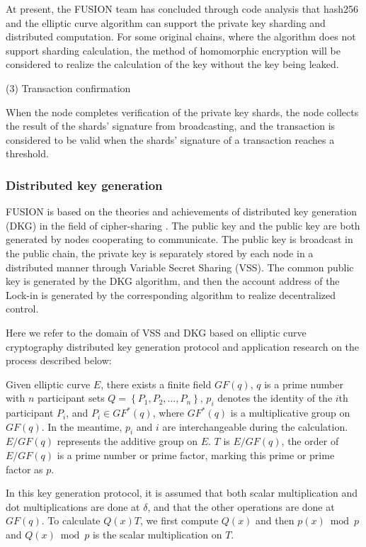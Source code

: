 \documentclass[a4paper,12pt]{article}
\begin{document}
At present, the FUSION team has concluded through code analysis that hash256 and the elliptic curve algorithm can support the private key sharding and distributed computation. For some original chains, where the algorithm does not support sharding calculation, the method of homomorphic encryption will be considered to realize the calculation of the key without the key being leaked.

(3) Transaction confirmation

When the node completes verification of the private key shards, the node collects the result of the shards' signature from broadcasting, and the transaction is considered to be valid when the shards' signature of a transaction reaches a threshold.

\subsubsection{Distributed key generation}

FUSION is based on the theories and achievements of distributed key generation (DKG) in the field of cipher-sharing \citep{Feldman 1987}. The public key and the public key are both generated by nodes cooperating to communicate. The public key is broadcast in the public chain, the private key is separately stored by each node in a distributed manner through Variable Secret Sharing (VSS). The common public key is generated by the DKG algorithm, and then the account address of the Lock-in is generated by the corresponding algorithm to realize decentralized control.

Here we refer to the domain of VSS and DKG based on elliptic curve cryptography distributed key generation protocol and application \citep{Wang2007} research on the process described below:

Given elliptic curve $E$, there exists a finite field $GF(q)$, $q$ is a prime number with $n$ participant sets $Q = \left\{ {{P_1},{P_2}, .. .,{P_n}} \right\}$, ${p_i}$ denotes the identity of the $i$th participant $P_{i}$, and ${P_i} \in G{F^*} \left( q \right)$, where $G{F^*}\left(q \right)$ is a multiplicative group on $GF \left( q \right)$. In the meantime, ${p_i}$ and $i$ are interchangeable during the calculation. $E/GF\left( q \right)$ represents the additive group on $E$. $T$ is $E/GF\left( q \right)$, the order of $E/GF\left(q \right)$ is a prime number or prime factor, marking this prime or prime factor as $p$.

In this key generation protocol, it is assumed that both scalar multiplication and dot multiplications are done at $\delta$, and that the other operations are done at $GF \left(q \right)$. To calculate $Q \left(x \right) T$, we first compute $Q \left(x \right)$ and then $p$$\left(x \right) \bmod p $ and $Q \left(x \right) \bmod p$ is the scalar multiplication on $T$.
\end{document}
